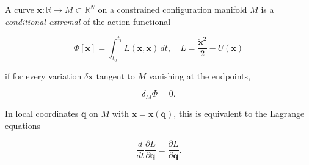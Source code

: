 A curve $\mathbf{x} : \mathbb{R} \to M \subset \mathbb{R}^N$ on a constrained configuration manifold $M$ is a \textit{conditional extremal} of the action functional

$$\Phi[\mathbf{x}] = \int_{t_0}^{t_1} L(\mathbf{x}, \dot{\mathbf{x}}) \, dt, \quad L = \frac{\dot{\mathbf{x}}^2}{2} - U(\mathbf{x})$$

if for every variation $\delta \mathbf{x}$ tangent to $M$ vanishing at the endpoints,

$$\delta_M \Phi = 0.$$

In local coordinates $\mathbf{q}$ on $M$ with $\mathbf{x} = \mathbf{x}(\mathbf{q})$, this is equivalent to the Lagrange equations

$$\frac{d}{dt} \frac{\partial L}{\partial \dot{\mathbf{q}}} = \frac{\partial L}{\partial \mathbf{q}}.$$

